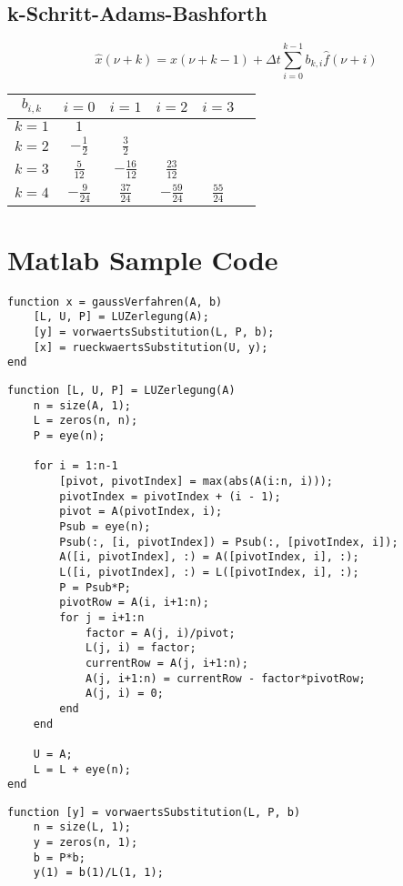 \documentclass[fs, footer]{latex4ei}
\begin{document}
\begin{multicols*}{4}
{\subsection{k-Schritt-Adams-Bashforth}
\begin{equation*}
	\hat x(\nu + k) = \hat x(\nu + k - 1) + \Delta t\sum_{i=0}^{k-1}b_{k,i}\hat f(\nu + i)
\end{equation*}
\begin{tabularx}{\columnwidth}{C|CCCCC}
$b_{i,k}$ & $i=0$ & $i=1$ & $i=2$ & $i=3$ \\ \hline
$k=1$ & $1$ & & & \\
$k=2$ & $-\frac{1}{2}$ & $\frac{3}{2}$ & & \\
$k=3$ & $\frac{5}{12}$ & $-\frac{16}{12}$ & $\frac{23}{12}$ & \\
$k=4$ & $-\frac{9}{24}$ & $\frac{37}{24}$ & $-\frac{59}{24}$ & $\frac{55}{24}$
\end{tabularx}
}

\section{Matlab Sample Code}
\begin{lstlisting}
function x = gaussVerfahren(A, b)
    [L, U, P] = LUZerlegung(A);
    [y] = vorwaertsSubstitution(L, P, b);
    [x] = rueckwaertsSubstitution(U, y);
end
\end{lstlisting}

\begin{lstlisting}
function [L, U, P] = LUZerlegung(A)
    n = size(A, 1);
    L = zeros(n, n);
    P = eye(n);

    for i = 1:n-1
        [pivot, pivotIndex] = max(abs(A(i:n, i)));
        pivotIndex = pivotIndex + (i - 1);
        pivot = A(pivotIndex, i);
        Psub = eye(n);
        Psub(:, [i, pivotIndex]) = Psub(:, [pivotIndex, i]);
        A([i, pivotIndex], :) = A([pivotIndex, i], :);
        L([i, pivotIndex], :) = L([pivotIndex, i], :);
        P = Psub*P;
        pivotRow = A(i, i+1:n);
        for j = i+1:n
            factor = A(j, i)/pivot;
            L(j, i) = factor;
            currentRow = A(j, i+1:n);
            A(j, i+1:n) = currentRow - factor*pivotRow;
            A(j, i) = 0;
        end
    end

    U = A;
    L = L + eye(n);
end
\end{lstlisting}

\begin{lstlisting}
function [y] = vorwaertsSubstitution(L, P, b)
    n = size(L, 1);
    y = zeros(n, 1);
    b = P*b;
    y(1) = b(1)/L(1, 1);


\end{lstlisting}
\end{multicols*}
\end{document}
